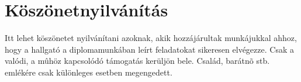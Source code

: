 \chapter*{Köszönetnyilvánítás}

Itt lehet köszönetet nyilvánítani azoknak, akik hozzájárultak munkájukkal ahhoz, hogy a hallgató a diplomamunkában leírt feladatokat sikeresen elvégezze. Csak a valódi, a mûhöz kapcsolódó támogatás kerüljön bele. Család, barátnõ stb. emlékére csak különleges esetben megengedett.